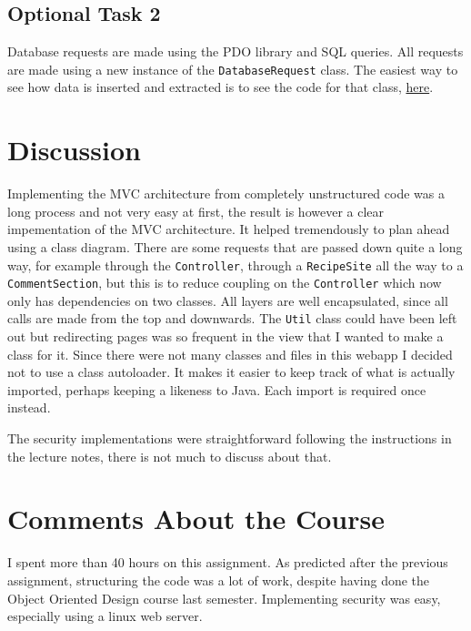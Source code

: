 \documentclass[a4paper]{scrreprt}
\newcommand{\code}[1]{\texttt{#1}}
\begin{document}
\section{Optional Task 2}

Database requests are made using the PDO library and SQL queries. All requests are made using a new instance of the \code{DatabaseRequest} class. The easiest way to see how data is inserted and extracted is to see the code for that class, \href{https://github.com/fongie/TastyRecipes/blob/assignment3/src/integration/DatabaseRequest.php}{here}.

\chapter{Discussion}

Implementing the MVC architecture from completely unstructured code was a long process and not very easy at first, the result is however a clear impementation of the MVC architecture. It helped tremendously to plan ahead using a class diagram. There are some requests that are passed down quite a long way, for example through the \code{Controller}, through a \code{RecipeSite} all the way to a \code{CommentSection}, but this is to reduce coupling on the \code{Controller} which now only has dependencies on two classes. All layers are well encapsulated, since all calls are made from the top and downwards. The \code{Util} class could have been left out but redirecting pages was so frequent in the view that I wanted to make a class for it. Since there were not many classes and files in this webapp I decided not to use a class autoloader. It makes it easier to keep track of what is actually imported, perhaps keeping a likeness to Java. Each import is required once instead.

The security implementations were straightforward following the instructions in the lecture notes, there is not much to discuss about that.

\chapter{Comments About the Course}

I spent more than 40 hours on this assignment.
As predicted after the previous assignment, structuring the code was a lot of work, despite having done the Object Oriented Design course last semester.
Implementing security was easy, especially using a linux web server.
\end{document}
